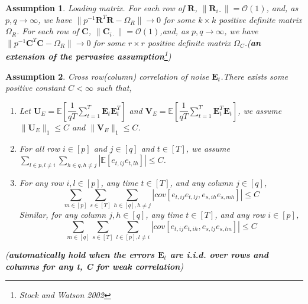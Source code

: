 \documentclass{article}[12pt]
\newtheorem{assumption}{Assumption}
\begin{document}
\begin{assumption}\label{assumption 3 1.7.1}
    Loading matrix. \normalfont For each row of $\mathbf{R}$, $\lVert\mathbf{R}_{i\cdot}\rVert = \mathcal{O}(1)$, and, as $p,q \rightarrow \infty$, we have $\lVert p^{-1}\mathbf{R}^T\mathbf{R}-\Omega_R\rVert \rightarrow 0$ for some $k \times k$ positive definite matrix $\Omega_R$. For each row of $\mathbf{C}$, $\lVert\mathbf{C}_{i\cdot}\rVert = \mathcal{O}(1)$,and, as $p,q \rightarrow \infty$, we have $\lVert p^{-1}\mathbf{C}^T\mathbf{C}-\Omega_R\rVert \rightarrow 0$ for some $r \times r$ positive definite matrix $\Omega_C$.(\textbf{\textit{an extension of the pervasive assumption}}\footnote{Stock and Watson 2002})
\end{assumption}

\begin{assumption}\label{assumption 4 1.7.1}
    Cross row(column) correlation of noise $\mathbf{E}_t$.\normalfont  There exists some positive constant $C<\infty$ such that,
    \begin{enumerate}
        \item Let $\mathbf{U}_E = \mathbb{E}\left[\dfrac{1}{qT}\sum_{t=1}^T\mathbf{E}_t\mathbf{E}_t^T\right]$ and $\mathbf{V}_E = \mathbb{E}\left[\dfrac{1}{qT}\sum_{t=1}^T\mathbf{E}_t^T\mathbf{E}_t\right]$, we assume $\lVert\mathbf{U}_E\rVert_1\leq C$ and $\lVert\mathbf{V}_E\rVert_1\leq C$.
        \item For all row $i \in \left[p\right]$ and $j \in \left[q\right]$ and $t \in \left[T\right]$, we assume $\sum_{l \in p, l \neq i}\sum_{h \in q, h \neq j}|\mathbb{E}\left[e_{t,ij}e_{t,lh}\right]|\leq C$.
        \item For any row $i,l \in \left[p\right]$, any time $t \in \left[T\right]$, and any column $j \in \left[q\right]$,
        $$\sum\limits_{m \in \left[p\right]}\sum\limits_{s \in \left[T\right]}\sum\limits_{h \in \left[q\right], h \neq j}|cov\left[e_{t,ij}e_{t,lj},e_{s,ih}e_{s,mh}\right]| \leq C$$
        \noindent Similar, for any column $j,h \in \left[q\right]$, any time $t \in \left[T\right]$, and any row $i \in \left[p\right]$,
        $$\sum\limits_{m \in \left[q\right]}\sum\limits_{s \in \left[T\right]}\sum\limits_{l \in \left[p\right], l \neq i}|cov\left[e_{t,ij}e_{t,ih},e_{s,lj}e_{s,lm}\right]| \leq C$$
    \end{enumerate}
    
    \noindent (\textbf{\textit{automatically hold when the errors $\mathbf{E}_t$ are i.i.d. over rows and columns for any t, C for weak correlation}})
\end{assumption}
\end{document}
